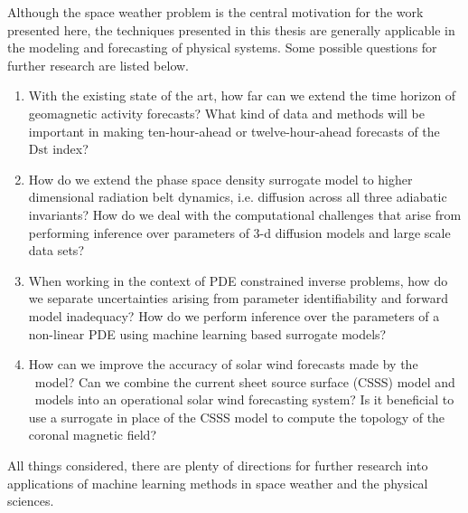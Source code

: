 Although the space weather problem is the central motivation for the work presented here, the 
techniques presented in this thesis are generally applicable in the modeling and forecasting of 
physical systems. Some possible questions for further research are listed below.
%
\begin{enumerate}
    \item With the existing state of the art, how far can we extend the time horizon of geomagnetic 
          activity forecasts? What kind of data and methods will be important in making 
          ten-hour-ahead or twelve-hour-ahead forecasts of the $\mathrm{Dst}$ index?
    \item How do we extend the phase space density surrogate model to higher dimensional 
          radiation belt dynamics, i.e. diffusion across all three adiabatic invariants?
          How do we deal with the computational challenges that arise from performing inference 
          over parameters of $3$-d diffusion models and large scale data sets? 
    \item When working in the context of PDE constrained inverse problems, how do we separate 
          uncertainties arising from parameter identifiability and forward model inadequacy? How do 
          we perform inference over the parameters of a non-linear PDE using machine learning based 
          surrogate models?
    \item How can we improve the accuracy of solar wind forecasts made by the \XX \ model? Can we 
          combine the current sheet source surface (CSSS) model and \XX \ models into an 
          operational solar wind forecasting system? Is it beneficial to use a surrogate in place 
          of the CSSS model to compute the topology of the coronal magnetic field? 
\end{enumerate}
%
All things considered, there are plenty of directions for further research into applications of 
machine learning methods in space weather and the physical sciences.
